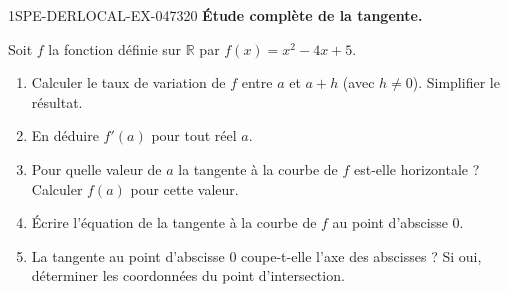 \begin{exercice}{1SPE-DERLOCAL-EX-047}{3}{20}
\textbf{Étude complète de la tangente.}

Soit $f$ la fonction définie sur $\mathbb{R}$ par $f(x) = x^2 - 4x + 5$.

\begin{enumerate}
  \item Calculer le taux de variation de $f$ entre $a$ et $a + h$ (avec $h
\neq 0$). Simplifier le résultat.
  \item En déduire $f'(a)$ pour tout réel $a$.
  \item Pour quelle valeur de $a$ la tangente à la courbe de $f$ est-elle horizontale ? Calculer $f(a)$ pour cette valeur.
  \item Écrire l'équation de la tangente à la courbe de $f$ au point d'abscisse $0$.
  \item La tangente au point d'abscisse $0$ coupe-t-elle l'axe des abscisses ? Si oui, déterminer les coordonnées du point d'intersection.
\end{enumerate}
\end{exercice}
